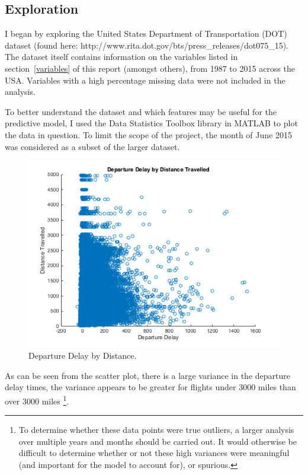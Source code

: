 \documentclass[a4paper, 10pt]{article}
\begin{document}
\subsection{Exploration}
I began by exploring the United States Department of Transportation (DOT) dataset (found here: http://www.rita.dot.gov/bts/press\_releases/dot075\_15). The dataset itself contains information on the variables listed in section~\ref{variables} of this report (amongst others), from 1987 to 2015 across the USA. Variables with a high percentage missing data were not included in the analysis.

\vspace{5mm}
To better understand the dataset and which features may be useful for the predictive model, I used the Data Statistics Toolbox library in MATLAB to plot the data in question. To limit the scope of the project, the month of June 2015 was considered as a subset of the larger dataset. 

\begin{figure}[H]
\begin{center}
\includegraphics[scale=0.5]{departureDelayByDistanceTravelled}
\caption{Departure Delay by Distance.}
\label{departureDelayByDistanceTravelled}
\end{center}
\end{figure}

As can be seen from the scatter plot, there is a large variance in the departure delay times, the variance appears to be greater for flights under 3000 miles than over 3000 miles \footnote{To determine whether these data points were true outliers, a larger analysis over multiple years and months should be carried out. It would otherwise be difficult to determine whether or not these high variances were meaningful (and important for the model to account for), or spurious.}. 
\end{document}
